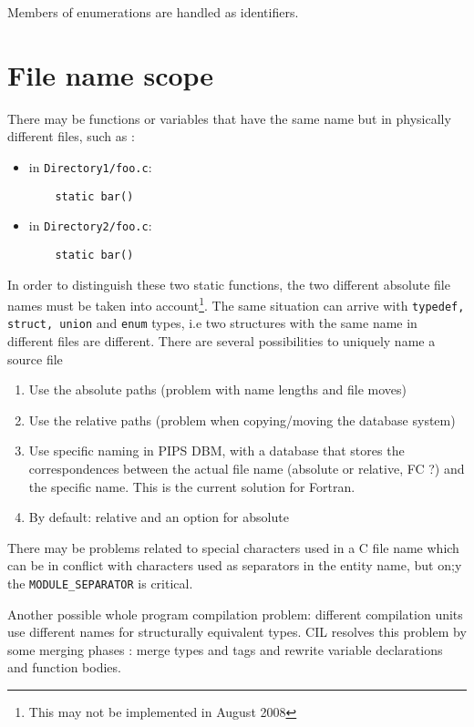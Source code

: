 \documentclass[a4paper]{report}
\begin{document}
Members of enumerations are handled as identifiers.

\section{File name scope}

There may be functions or variables that have the same name but in physically
  different files, such as :

\begin{itemize}
\item in \texttt{Directory1/foo.c}:
  \begin{lstlisting}
    static bar()
  \end{lstlisting}
\item in \texttt{Directory2/foo.c}:
  \begin{lstlisting}
    static bar()
  \end{lstlisting}
\end{itemize}

In order to distinguish these two static functions, the two different
absolute file names must be taken into account\footnote{This may not
  be implemented in August 2008}. The same situation can arrive with
\verb/typedef, struct, union/ and \verb/enum/ types, i.e two
structures with the same name in different files are different.  There
are several possibilities to uniquely name a source file
\begin{enumerate}
\item Use the absolute paths (problem with name lengths and file moves)
\item Use the relative paths (problem when copying/moving the
  database system)
\item Use specific naming in PIPS DBM, with a database that stores the
  correspondences between the actual file name (absolute or relative, FC
  ?) and the specific name. This is the current solution for Fortran.
\item By default: relative and an option for absolute 
\end{enumerate}
There may be problems related to special characters used in a C file
name which can be in conflict with characters used as separators in
the entity name, but on;y the \verb/MODULE_SEPARATOR/ is critical.

Another possible whole program compilation problem: different
compilation units use different names for structurally equivalent
types. CIL \cite{Necu02} resolves this problem by some merging phases
: merge types and tags and rewrite variable declarations and function
bodies.
\end{document}
